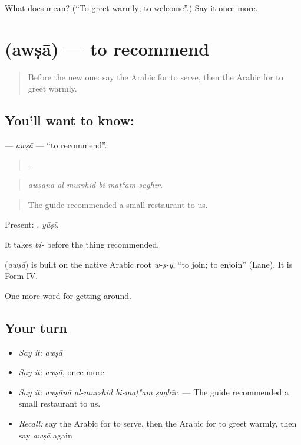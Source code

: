 \begin{tcolorbox}[breakable,colback=teal!4,colframe=teal!35!black,title={Before you move on}]
What does  mean? (\textquotedblleft{}To greet warmly; to welcome\textquotedblright{}.) Say it once more.
\end{tcolorbox}
\section[\texorpdfstring{\ar{أوصى} (awṣā)}{أوصى (awṣā)}]{ (awṣā) — to recommend}

\label{lesson:AR-C446-awsa}



\begin{quote}
Before the new one: say the Arabic for to serve, then the Arabic for to greet warmly.
\end{quote}

\subsection*{You'll want to know: }
\textbf{} — \emph{awṣā} — \textquotedblleft{}to recommend\textquotedblright{}.

\begin{quote}
   .
\end{quote}

\begin{quote}
\emph{awṣānā al-murshid bi-maṭʿam ṣaghīr.}
\end{quote}

\begin{quote}
The guide recommended a small restaurant to us.
\end{quote}

Present: , \emph{yūṣī}.

It takes \emph{bi-} before the thing recommended.

\begin{cousinweb}
\textbf{} (\emph{awṣā}) is built on the native Arabic root \emph{w-ṣ-y}, \textquotedblleft{}to join; to enjoin\textquotedblright{} (Lane). It is Form IV.
\end{cousinweb}

\begin{grammarlens}[title={What you've built}]
One more word for getting around.
\end{grammarlens}

\subsection*{Your turn}
\begin{itemize}
\raggedright
  \item \emph{Say it:} \emph{awṣā}
  \item \emph{Say it:} \emph{awṣā}, once more
  \item \emph{Say it:} \emph{awṣānā al-murshid bi-maṭʿam ṣaghīr.} — The guide recommended a small restaurant to us.
  \item \emph{Recall:} say the Arabic for to serve, then the Arabic for to greet warmly, then say \emph{awṣā} again
\end{itemize}

